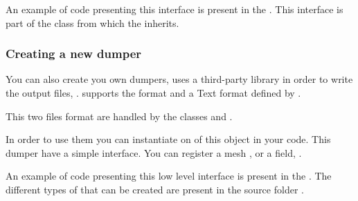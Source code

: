 An example of code presenting this interface is present in the
. This interface is part of the
 class from which the  inherits.

\subsubsection{Creating a new dumper}

You can also create you own dumpers, \akantu uses a third-party library in order
to write the output files, . \akantu supports the 
format and a Text format defined by .

This two files format are handled by the classes
 and
.

In order to use them you can instantiate on of this object in your code. This
dumper have a simple interface. You can register a mesh
,
 or a field,
.

An example of code presenting this low level interface is present in the
. The different types of  that can
be created are present in the source folder .

